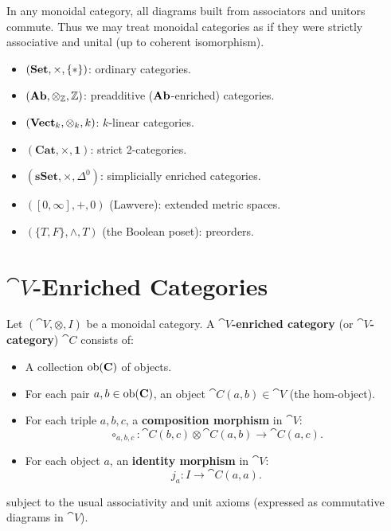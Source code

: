 \begin{theorem}
In any monoidal category, all diagrams built from associators and unitors commute. Thus we may treat monoidal categories as if they were strictly associative and unital (up to coherent isomorphism).
\end{theorem}

\begin{example}
\leavevmode
\begin{itemize}
  \item $(\mathbf{Set}, \times, \{*\})$: ordinary categories.
  \item $(\mathbf{Ab}, \otimes_\mathbb{Z}, \mathbb{Z})$: preadditive ($\mathbf{Ab}$-enriched) categories.
  \item $(\mathbf{Vect}_k, \otimes_k, k)$: $k$-linear categories.
  \item $(\mathbf{Cat}, \times, \mathbf{1})$: strict 2-categories.
  \item $(\mathbf{sSet}, \times, \Delta^0)$: simplicially enriched categories.
  \item $([0,\infty], +, 0)$ (Lawvere): extended metric spaces.
  \item $(\{T, F\}, \wedge, T)$ (the Boolean poset): preorders.
\end{itemize}
\end{example}

\section{$\cat{V}$-Enriched Categories}

\begin{definition}
Let $(\cat{V}, \otimes, I)$ be a monoidal category. A \textbf{$\cat{V}$-enriched category} (or \textbf{$\cat{V}$-category}) $\cat{C}$ consists of:
\begin{itemize}
  \item A collection $\operatorname{ob}(\mathbf{C})$ of objects.
  \item For each pair $a, b \in \operatorname{ob}(\mathbf{C})$, an object $\cat{C}(a,b) \in \cat{V}$ (the hom-object).
  \item For each triple $a,b,c$, a \textbf{composition morphism} in $\cat{V}$:
  \[
    \circ_{a,b,c}: \cat{C}(b,c) \otimes \cat{C}(a,b) \to \cat{C}(a,c).
  \]
  \item For each object $a$, an \textbf{identity morphism} in $\cat{V}$:
  \[
    j_a: I \to \cat{C}(a,a).
  \]
\end{itemize}
subject to the usual associativity and unit axioms (expressed as commutative diagrams in $\cat{V}$).
\end{definition}

